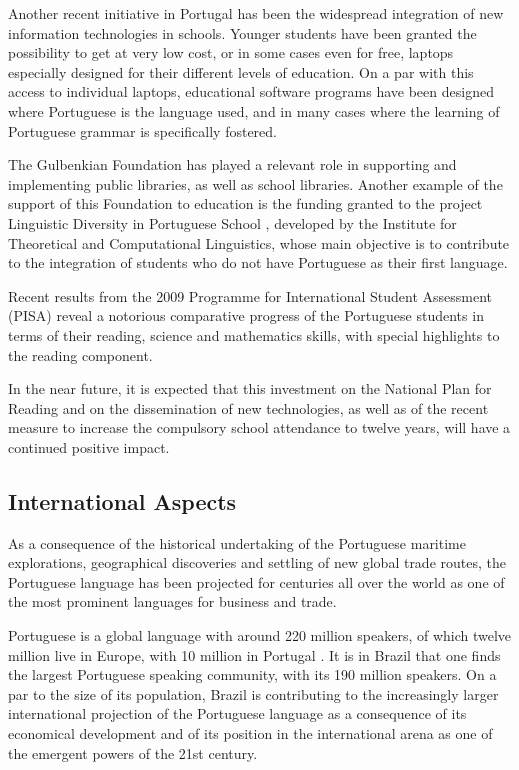 \begin{multicols}{2}
Another recent initiative in Portugal has been the widespread integration of new information technologies in schools. Younger students have been granted the possibility to get at very low cost, or in some cases even for free, laptops especially designed for their different levels of education. On a par with this access to individual laptops, educational software programs have been designed where Portuguese is the language used, and in many cases where the learning of Portuguese grammar is specifically fostered.


The Gulbenkian Foundation has played a relevant role in supporting and implementing public libraries, as well as school libraries. Another example of the support of this Foundation to education is the funding granted to the project Linguistic Diversity in Portuguese School \cite{gulbenkian2}, developed by the Institute for Theoretical and Computational Linguistics, whose main objective is to contribute to the integration of students who do not have Portuguese as their first language.

Recent results from the 2009 Programme for International Student Assessment (PISA) reveal a notorious comparative progress of the Portuguese students in terms of their reading, science and mathematics skills, with special highlights to the reading component. 

In the near future, it is expected that this investment on the National Plan for Reading and on the dissemination of new technologies, 
as well as of the recent measure to increase the compulsory school attendance to twelve years, will have a continued positive impact.

\subsection{International Aspects}

 As a consequence of the historical undertaking of the Portuguese maritime explorations, geographical discoveries and settling of new global trade routes, 
the Portuguese language has been projected for centuries all over the world as one of the most prominent languages for business and trade.

Portuguese is a global language with around 220 million speakers, of which twelve million live in Europe, with 10 million in Portugal \cite{census}. 
It is in Brazil that one finds the largest Portuguese speaking community, with its 190 million speakers. 
On a par to the size of its population, Brazil is contributing to the increasingly larger international projection of the Portuguese language as a consequence of its economical development and of its position in the international arena as one of the emergent powers of the 21st century. 


\end{multicols}
